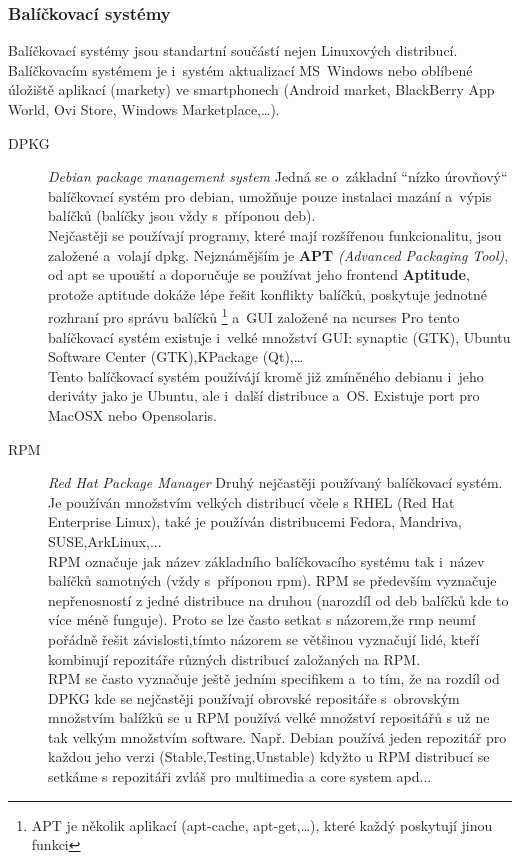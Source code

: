 \documentclass[a4paper,12pt]{article}
\renewcommand{\b}[1]{\textbf{#1}} %
\renewcommand{\it}[1]{\textit{#1}}		%
\begin{document}
\subsubsection{Balíčkovací systémy}
Balíčkovací systémy jsou standartní součástí nejen Linuxových distribucí. Balíčkovacím systémem je i~systém aktualizací MS Windows nebo oblíbené úložiště aplikací (markety) ve smartphonech (Android market, BlackBerry App World, Ovi Store, Windows Marketplace,…).
\begin{description}
 \item[DPKG] \it{Debian package management system} Jedná se o~základní ``nízko úrovňový`` balíčkovací systém pro debian, umožňuje pouze instalaci mazání a~výpis balíčků (balíčky jsou vždy s~příponou deb).\\
Nejčastěji se používají programy, které mají rozšířenou funkcionalitu, jsou založené a~volají dpkg. Nejznámějším je \b{APT} \it{(Advanced Packaging Tool)}\cite{DPKG}, od apt se upouští a doporučuje se používat jeho frontend \b{Aptitude}, protože aptitude dokáže lépe řešit konflikty balíčků, poskytuje jednotné rozhraní pro správu balíčků
\footnote{APT je několik aplikací (apt-cache, apt-get,…), které každý poskytují jinou funkci} a~GUI založené na ncurses Pro tento balíčkovací systém existuje i~velké množství GUI: synaptic (GTK), Ubuntu Software Center (GTK),KPackage (Qt),…\\
Tento balíčkovací systém používájí kromě již zmíněného debianu i~jeho deriváty jako je Ubuntu, ale i~další distribuce a~OS. Existuje port pro MacOSX nebo Opensolaris\cite{DPKG}.
 \item[RPM] \it{Red Hat Package Manager} Druhý nejčastěji používaný balíčkovací systém. Je používán množstvím velkých distribucí včele s RHEL (Red Hat Enterprise Linux), také je používán distribucemi Fedora, Mandriva, SUSE,ArkLinux,...\\
RPM označuje jak název základního balíčkovacího systému tak i~název balíčků samotných (vždy s~příponou rpm). RPM se především vyznačuje nepřenosností z jedné distribuce na druhou (narozdíl od deb balíčků kde to více méně funguje). Proto se lze často setkat s názorem,že rmp neumí pořádně řešit závislosti,tímto názorem se většinou vyznačují lidé, kteří kombinují repozitáře různých distribucí založaných na RPM.\\
RPM se často vyznačuje ještě jedním specifikem a~to tím, že na rozdíl od DPKG kde se nejčastěji používají obrovské repositáře s~obrovským množstvím balížků se u RPM používá velké množství repositářů s už ne tak velkým množstvím software. Např. Debian používá jeden repozitář pro každou jeho verzi (Stable,Testing,Unstable) kdyžto u RPM distribucí se setkáme s repozitáři zvláš pro multimedia a core system apd...\\

\end{description}
\end{document}
